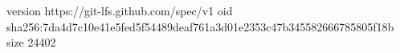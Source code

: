 version https://git-lfs.github.com/spec/v1
oid sha256:7da4d7c10e41e5fed5f54489deaf761a3d01e2353c47b345582666785805f18b
size 24402
